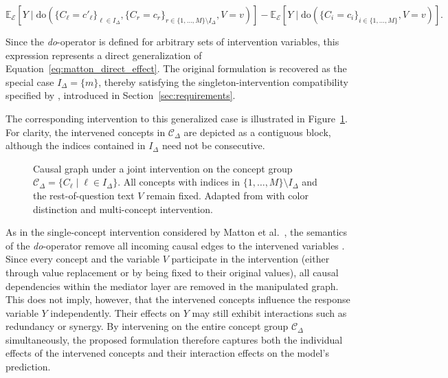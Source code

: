 \begin{equation}
	\label{eq:matton_multi_direct_effect}
	\mathbb{E}_{\mathcal{E}}[Y \mid
		\text{do}(\{C_\ell = c'_\ell\}_{\ell \in I_{\Delta}},
		\{C_r = c_r\}_{r \in \{1,\dots,M\}\setminus I_{\Delta}},
		V = v)]
	-
	\mathbb{E}_{\mathcal{E}}[Y \mid
		\text{do}(\{C_i = c_i\}_{i \in \{1,\dots,M\}},
		V = v)].
\end{equation}

Since the \emph{do}-operator is defined for arbitrary sets of intervention variables, this expression represents a direct generalization of Equation~\ref{eq:matton_direct_effect}. The original formulation is recovered as the special case $I_{\Delta}=\{m\}$, thereby satisfying the singleton-intervention compatibility specified by , introduced in Section~\ref{sec:requirements}.

The corresponding intervention to this generalized case is illustrated in Figure~\ref{fig:dgp_joint_intervened}. For clarity, the intervened concepts in $\mathcal{C}_{\Delta}$ are depicted as a contiguous block, although the indices contained in $I_{\Delta}$ need not be consecutive.

\begin{figure}[ht]
	\centering
	
	\caption{Causal graph under a joint intervention on the concept group $\mathcal{C}_{\Delta}=\{C_\ell \mid \ell \in I_{\Delta}\}$. All concepts with indices in $\{1,\dots,M\}\setminus I_{\Delta}$ and the rest-of-question text $V$ remain fixed. Adapted from \cite{mattonWalkTalkMeasuring2024} with color distinction and multi-concept intervention.}
	\label{fig:dgp_joint_intervened}
\end{figure}

As in the single-concept intervention considered by Matton et al.~\cite{mattonWalkTalkMeasuring2024}, the semantics of the \emph{do}-operator remove all incoming causal edges to the intervened variables \cite{pearlCausality2009}. Since every concept and the variable $V$ participate in the intervention (either through value replacement or by being fixed to their original values), all causal dependencies within the mediator layer are removed in the manipulated graph. This does not imply, however, that the intervened concepts influence the response variable $Y$ independently. Their effects on $Y$ may still exhibit interactions such as redundancy or synergy. By intervening on the entire concept group $\mathcal{C}_{\Delta}$ simultaneously, the proposed formulation therefore captures both the individual effects of the intervened concepts and their interaction effects on the model's prediction.
